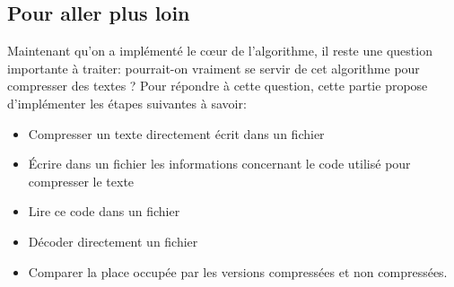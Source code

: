 \documentclass[a4paper, 10pt]{article}
\begin{document}
\subsection{Pour aller plus loin}
Maintenant qu'on a implémenté le cœur de l'algorithme, il reste une question importante à traiter: pourrait-on vraiment se servir de cet algorithme pour compresser des textes ? Pour répondre à cette question, cette partie propose d'implémenter les étapes suivantes à savoir:
\begin{itemize}
\item Compresser un texte directement écrit dans un fichier
\item Écrire dans un fichier les informations concernant le code utilisé pour compresser le texte
\item Lire ce code dans un fichier
\item Décoder directement un fichier
\item Comparer la place occupée par les versions compressées et non compressées.
\end{itemize}
\end{document}
